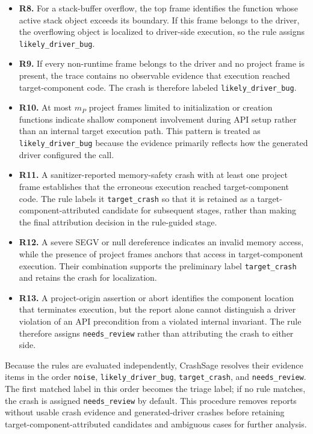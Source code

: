 \documentclass[pdflatex,sn-basic]{sn-jnl}%
\theoremstyle{thmstyleone}%
\theoremstyle{thmstyletwo}%
\theoremstyle{thmstylethree}%
\begin{document}
\begin{itemize}
    \item \textbf{R8.} For a stack-buffer overflow, the top frame identifies the function whose active stack object exceeds its boundary. If this frame belongs to the driver, the overflowing object is localized to driver-side execution, so the rule assigns \texttt{likely\_driver\_bug}.
    \item \textbf{R9.} If every non-runtime frame belongs to the driver and no project frame is present, the trace contains no observable evidence that execution reached target-component code. The crash is therefore labeled \texttt{likely\_driver\_bug}.
    \item \textbf{R10.} At most \(m_P\) project frames limited to initialization or creation functions indicate shallow component involvement during API setup rather than an internal target execution path. This pattern is treated as \texttt{likely\_driver\_bug} because the evidence primarily reflects how the generated driver configured the call.
    \item \textbf{R11.} A sanitizer-reported memory-safety crash with at least one project frame establishes that the erroneous execution reached target-component code. The rule labels it \texttt{target\_crash} so that it is retained as a target-component-attributed candidate for subsequent stages, rather than making the final attribution decision in the rule-guided stage.
    \item \textbf{R12.} A severe SEGV or null dereference indicates an invalid memory access, while the presence of project frames anchors that access in target-component execution. Their combination supports the preliminary label \texttt{target\_crash} and retains the crash for localization.
    \item \textbf{R13.} A project-origin assertion or abort identifies the component location that terminates execution, but the report alone cannot distinguish a driver violation of an API precondition from a violated internal invariant. The rule therefore assigns \texttt{needs\_review} rather than attributing the crash to either side.
\end{itemize}

Because the rules are evaluated independently, CrashSage resolves their evidence items in the order \texttt{noise}, \texttt{likely\_driver\_bug}, \texttt{target\_crash}, and \texttt{needs\_review}.
The first matched label in this order becomes the triage label; if no rule matches, the crash is assigned \texttt{needs\_review} by default.
This procedure removes reports without usable crash evidence and generated-driver crashes before retaining target-component-attributed candidates and ambiguous cases for further analysis.
\end{document}
